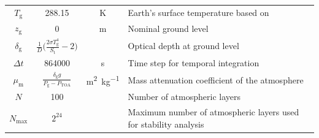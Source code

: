 \documentclass[a4paper,10pt,twocolumn,\classoptions]{article}
\newcommand{\PTOA}{P_\text{TOA}}
\begin{document}
\begin{table}[h]
\begin{tabular}[b]{cccp{}}
    $T_\text{g}$      & \num{288.15}                                                           & \unit{\kelvin}                                    & Earth's surface temperature based on \cite[2]{US1976}                                     \\
    $z_\text{g}$      & \num{0}                                                                & \unit{\metre}                                     & Nominal ground level                                                                      \\
    \midrule
    $\delta_\text{g}$ & $\frac{1}{D} \Big( \frac{2 \sigma T_\text{g}^4}{S_\text{t}} - 2 \Big)$ &                                                   & Optical depth at ground level                                                             \\
    $\Delta t$        & \num{864000}                                                           & \unit{\second}                                    & Time step for temporal integration                                                        \\
    $\mu_\text{m}$    & $\frac{\delta_\text{g} g}{P_\text{g} - \PTOA}$                         & \unit{\square\metre\per\kilogram}                 & Mass attenuation coefficient of the atmosphere                                            \\
    $N$               & \num{100}                                                              &                                                   & Number of atmospheric layers                                                              \\
    $N_\text{max}$    & $2^{24}$                                                               &                                                   & Maximum number of atmospheric layers used for stability analysis                          \\

\end{tabular}
\end{table}
\end{document}
